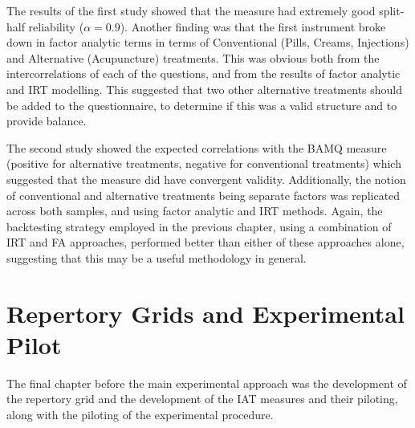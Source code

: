 The results of the first study showed that the measure had extremely good split-half reliability ($ \alpha=0.9$). Another finding was that the first instrument broke down in factor analytic terms in terms of Conventional (Pills, Creams, Injections) and Alternative (Acupuncture) treatments. This was obvious both from the intercorrelations of each of the questions, and from the results of factor analytic and IRT modelling. This suggested that two other alternative treatments should be added to the questionnaire, to determine if this was a valid structure and to provide balance. 

The second study showed the expected correlations  with the BAMQ measure (positive for alternative treatments, negative for conventional treatments) which suggested that the measure did have convergent validity. Additionally, the notion of conventional and alternative treatments being separate factors was replicated across both samples, and using factor analytic and IRT methods. Again, the backtesting strategy employed in the previous chapter, using a combination of IRT and FA approaches, performed better than either of these approaches alone, suggesting that this may be a useful methodology in general. 


\section{Repertory Grids and Experimental Pilot}
\label{sec:qual-rese-rep}

The final chapter before the main experimental approach was the development of the repertory grid and the development of the IAT measures and their piloting, along with the piloting of the experimental procedure. 


